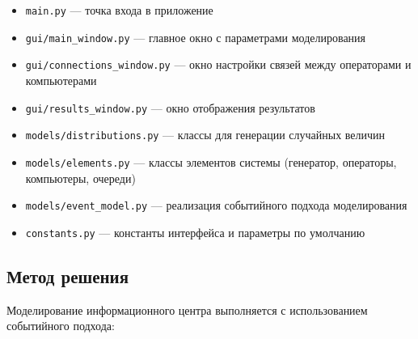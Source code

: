 \begin{itemize}
    \item \texttt{main.py} — точка входа в приложение
    \item \texttt{gui/main\_window.py} — главное окно с параметрами моделирования
    \item \texttt{gui/connections\_window.py} — окно настройки связей между операторами и компьютерами
    \item \texttt{gui/results\_window.py} — окно отображения результатов
    \item \texttt{models/distributions.py} — классы для генерации случайных величин
    \item \texttt{models/elements.py} — классы элементов системы (генератор, операторы, компьютеры, очереди)
    \item \texttt{models/event\_model.py} — реализация событийного подхода моделирования
    \item \texttt{constants.py} — константы интерфейса и параметры по умолчанию
\end{itemize}

\subsection{Метод решения}

Моделирование информационного центра выполняется с использованием событийного подхода:


